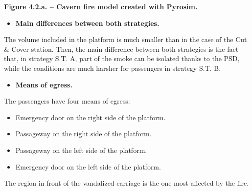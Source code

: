 \documentclass{article}
\begin{document}
\begin{mdcenter}%

\noindent{}\textbf{Figure 4.2.a. – Cavern fire model created with Pyrosim.}%
\end{mdcenter}%

\begin{itemize}[noitemsep,topsep=\mdcompacttopsep]%

\item{}\textbf{Main differences between both strategies.}%
\end{itemize}%

\noindent{}The volume included in the platform is much smaller than in the case of the 
Cut \& Cover station. Then, the main difference between both strategies is the 
fact that, in strategy S.T. A, part of the smoke can be isolated thanks to the 
PSD, while the conditions are much harsher for passengers in strategy S.T. B.%

\begin{itemize}[noitemsep,topsep=\mdcompacttopsep]%

\item{}\textbf{Means of egress.}%
\end{itemize}%

\noindent{}The passengers have four means of egress:%

\begin{itemize}[noitemsep,topsep=\mdcompacttopsep]%

\item{}Emergency door on the right side of the platform.%

\item{}Passageway on the right side of the platform.%

\item{}Passageway on the left side of the platform.%

\item{}Emergency door on the left side of the platform.%
\end{itemize}%

\noindent{}The region in front of the vandalized carriage is the one most affected by the fire.%
\end{document}

